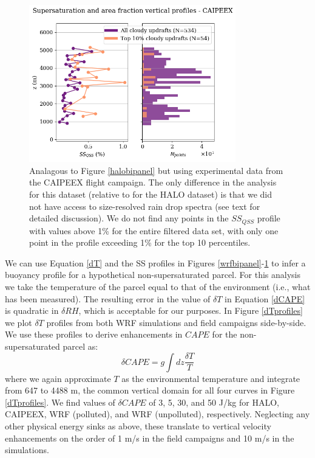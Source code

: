 \documentclass{article}
\begin{document}
\begin{figure}[ht]
    \centering
    \includegraphics[width=9cm]{revcaipeex/v8_FINAL_combined_bipanel_ss_qss_vs_z_figure.png}
    \caption{Analagous to Figure \ref{halobipanel} but using experimental data from the CAIPEEX flight campaign. The only difference in the analysis for this dataset (relative to for the HALO dataset) is that we did not have access to size-resolved rain drop spectra (see text for detailed discussion). We do not find any points in the $SS_{QSS}$ profile with values above 1\% for the entire filtered data set, with only one point in the profile exceeding 1\% for the top 10 percentiles.}
    \label{caipeexbipanel}
\end{figure}

We can use Equation \ref{dT} and the SS profiles in Figures \ref{wrfbipanel}-\ref{caipeexbipanel} to infer a buoyancy profile for a hypothetical non-supersaturated parcel. For this analysis we take the temperature of the parcel equal to that of the environment (i.e., what has been measured). The resulting error in the value of $\delta T$ in Equation \ref{dCAPE} is quadratic in $\delta RH$, which is acceptable for our purposes. In Figure \ref{dTprofiles} we plot $\delta T$ profiles from both WRF simulations and field campaigns side-by-side. We use these profiles to derive enhancements in $CAPE$ for the non-supersaturated parcel as:
\begin{equation}
\label{dCAPE}
\delta CAPE = g \int dz \frac{\delta T}{T}
\end{equation}
where we again approximate $T$ as the environmental temperature and integrate from 647 to 4488 m, the common vertical domain for all four curves in Figure \ref{dTprofiles}. We find values of $\delta CAPE$ of 3, 5, 30, and 50 J/kg for HALO, CAIPEEX, WRF (polluted), and WRF (unpolluted), respectively. Neglecting any other physical energy sinks as above, these translate to vertical velocity enhancements on the order of 1 m/s in the field campaigns and 10 m/s in the simulations.
\end{document}
